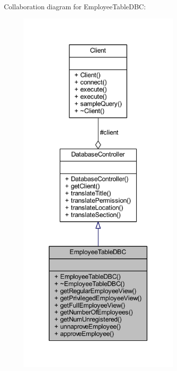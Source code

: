 Collaboration diagram for Employee\+Table\+D\+B\+C\+:
\nopagebreak
\begin{figure}[H]
\begin{center}
\leavevmode
\includegraphics[width=231pt]{class_employee_table_d_b_c__coll__graph}
\end{center}
\end{figure}
